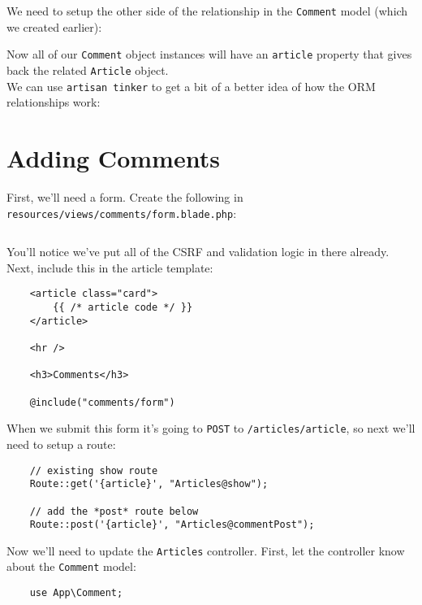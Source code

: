 We need to setup the other side of the relationship in the \texttt{Comment} model (which we created earlier):


Now all of our \texttt{Comment} object instances will have an \texttt{article} property that gives back the related \texttt{Article} object.
\\

We can use \texttt{artisan tinker} to get a bit of a better idea of how the ORM relationships work:



\section{Adding Comments}

First, we'll need a form. Create the following in \\ \texttt{resources/views/comments/form.blade.php}:

\inputminted{html}{10-one-to-many/figures/comments-form.blade.php}

You'll notice we've put all of the CSRF and validation logic in there already.
\\

Next, include this in the article template:

\begin{verbatim}
    <article class="card">
        {{ /* article code */ }}
    </article>

    <hr />

    <h3>Comments</h3>

    @include("comments/form")
\end{verbatim}

When we submit this form it's going to \texttt{POST} to \texttt{/articles/{article}}, so next we'll need to setup a route:

\begin{verbatim}
    // existing show route
    Route::get('{article}', "Articles@show");

    // add the *post* route below
    Route::post('{article}', "Articles@commentPost");
\end{verbatim}


Now we'll need to update the \texttt{Articles} controller. First, let the controller know about the \texttt{Comment} model:

\begin{verbatim}
    use App\Comment;
\end{verbatim}


